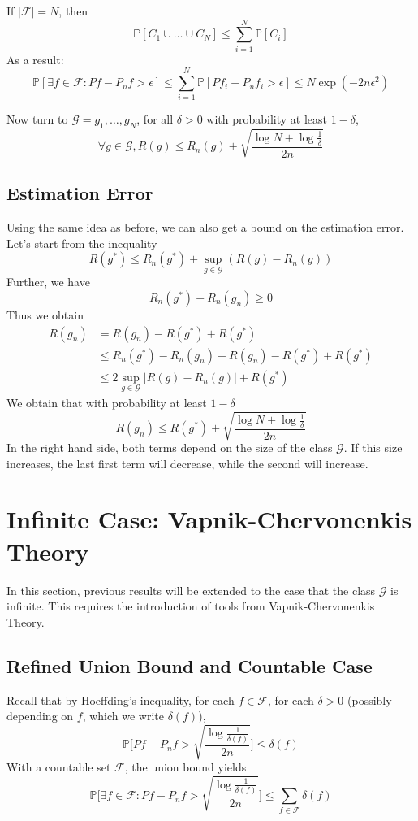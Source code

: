 \documentclass[12pt,reqno]{amsart}
\begin{document}
If $|\mathcal{F}| = N$, then
$$
	\mathbb{P}[C_1\cup \ldots \cup C_N] \leq \sum_{i=1}^N \mathbb{P}[C_i]
$$
As a result:
$$
	\mathbb{P}[\exists f\in \mathcal{F}: Pf-P_nf > \epsilon] \leq \sum_{i=1}^N \mathbb{P}[Pf_i-P_nf_i>\epsilon] \leq N \exp (-2n\epsilon^2)
$$

Now turn to $\mathcal{G} = {g_1,\ldots, g_N}$, for all $\delta > 0$ with probability at least $1-\delta$,
$$
	\forall g \in \mathcal{G}, R(g) \leq R_n(g) + \sqrt{\frac{\log N + \log\frac{1}{\delta}}{2n}}
$$

\subsection{Estimation Error}
Using the same idea as before, we can also get a bound on the estimation error. Let's start from the inequality
\begin{equation}
	R(g^*) \leq R_n(g^*) + \sup_{g\in \mathcal{G}}(R(g)-R_n(g))
\end{equation}
Further, we have 
$$
	R_n(g^*) - R_n(g_n) \geq 0
$$
Thus we obtain
\begin{align}
	R(g_n) &=     R(g_n) - R(g^*) + R(g^*)\\
		   &\leq  R_n(g^*) - R_n(g_n) + R(g_n) -R(g^*) + R(g^*)\\
		   &\leq  2\sup_{g\in\mathcal{G}}|R(g)-R_n(g)| + R(g^*)
\end{align}
We obtain that with probability at least $1-\delta$
\begin{equation}
	R(g_n) \leq R(g^*) + \sqrt{\frac{\log N + \log\frac{1}{\delta}}{2n}}
\end{equation}	
In the right hand side, both terms depend on the size of the class $\mathcal{G}$. If this size increases, the last first term will decrease, while the second will increase.




\section{Infinite Case: Vapnik-Chervonenkis Theory}
In this section, previous results will be extended to the case that the class $\mathcal{G}$ is infinite. This requires the introduction of tools from Vapnik-Chervonenkis Theory.

\subsection{Refined Union Bound and Countable Case}
Recall that by Hoeffding's inequality, for each $f\in \mathcal{F}$, for each $\delta > 0$ (possibly depending on $f$, which we write $\delta(f)$),
$$
	\mathbb{P} \bigg [ Pf-P_nf > \sqrt{\frac{\log \frac{1}{\delta(f)}}{2n}} \bigg] \leq \delta(f)
$$
With a countable set $\mathcal{F}$, the union bound yields
$$
	\mathbb{P} \bigg [\exists f\in \mathcal{F}: Pf-P_nf > \sqrt{\frac{\log \frac{1}{\delta (f)}}{2n}} \bigg ] \leq \sum_{f\in\mathcal{F}}\delta(f)
$$
\end{document}
